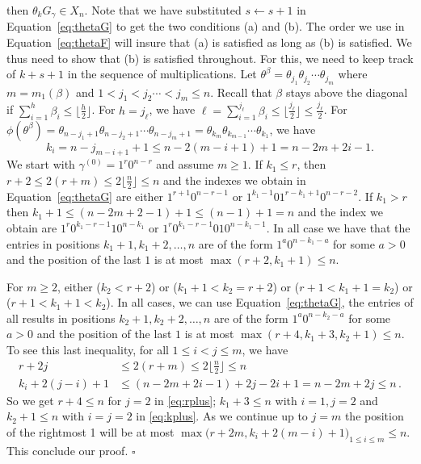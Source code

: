 \documentclass[11pt]{amsart}
\theoremstyle{definition}
\numberwithin{equation}{section}
\begin{document}
then $\theta_kG_\gamma\in X_n$. Note that we have substituted $s\leftarrow s+1$ in Equation~\eqref{eq:thetaG} to get the two conditions (a) and (b).
The order we use in Equation~\eqref{eq:thetaF} will insure that (a) is satisfied as long as (b) is satisfied. We thus need to show that (b) is satisfied throughout.
For this, we need to keep track of $k+s+1$ in the sequence of multiplications. 
Let $\theta^\beta=\theta_{j_1} \theta_{j_2}\cdots \theta_{j_m}$ where $m=m_1(\beta)$ and 
$1<j_1< j_2\cdots <j_m\le n$. Recall that $\beta$ stays above the diagonal if $\sum_{i=1}^h \beta_i\le \lfloor\frac{h}{2}\rfloor$. For $h=j_\ell$, we have
 $\ell=\sum_{i=1}^{j_\ell} \beta_i\le \lfloor\frac{j_\ell}{2}\rfloor\le \frac{j_\ell}{2}$. 
For $\phi(\theta^\beta)=\theta_{n-j_1+1} \theta_{n-j_2+1}\cdots \theta_{n-j_m+1}=\theta_{k_m} \theta_{k_{m-1}}\cdots \theta_{k_1}$, we have
 $$  k_i = n-j_{m-i+1}+1 \le n-2(m-i+1)+1 = n-2m+2i-1.
 $$
We start with $\gamma^{(0)}=1^r0^{n-r}$ and assume $m\ge 1$.
 If $k_1\le r$, then $r+2\le 2(r+m)\le 2\lfloor\frac{n}{2}\rfloor\le n$ and the indexes we obtain in Equation~\eqref{eq:thetaG} are either
$1^{r+1}0^{n-r-1}$ or $1^{k_1-1}01^{r-k_1+1}0^{n-r-2}$. If $k_1>r$ then $k_1+1\le (n-2m+2-1)+1\le  (n-1)+1=n$ and the index we obtain are $1^{r}0^{k_1-r-1}10^{n-k_1}$ or $1^{r}0^{k_1-r-1}010^{n-k_1-1}$. In all case we have that the entries in positions $k_1+1,k_1+2,\ldots, n$ are of  the form $1^a0^{n-k_1-a}$ for some $a> 0$ and the position of the last $1$ is at most $\max(r+2,k_1+1)\le n$. 

For $m\ge 2$, either ($k_2< r+2$) or ($k_1+1<k_2=r+2$) or ($r+1<k_1+1=k_2$) or ($r+1<k_1+1<k_2$). In all cases, we can use Equation~\eqref{eq:thetaG},  the entries of all results in positions $k_2+1,k_2+2,\ldots, n$ are of  the form $1^a0^{n-k_2-a}$ for some $a> 0$ and the position of the last $1$ is at most $\max(r+4,k_1+3, k_2+1)\le n$. 
To see this last inequality, for all $1\le i<j\le m$, we have
\begin{align}
 r+2j&\le  2(r+m)\le 2\lfloor\frac{n}{2}\rfloor\le n \label{eq:rplus}\\
 k_i+2(j-i)+1&\le (n-2m+2i-1)+2j-2i+1=n-2m+2j\le n\,. \label{eq:kplus}
 \end{align}
So we get $r+4\le n$ for $j=2$ in \eqref{eq:rplus}; $k_1+3\le n$ with $i=1,j=2$ and $k_2+1\le n$ with $i=j=2$ in \eqref{eq:kplus}. As we continue up to $j=m$
the position of the rightmost 1 will be at most $\max\big( r+2m, k_i+2(m-i)+1\big)_{1\le i\le m}\le n$. This conclude our proof.
\hfill$\square$
\end{document}
